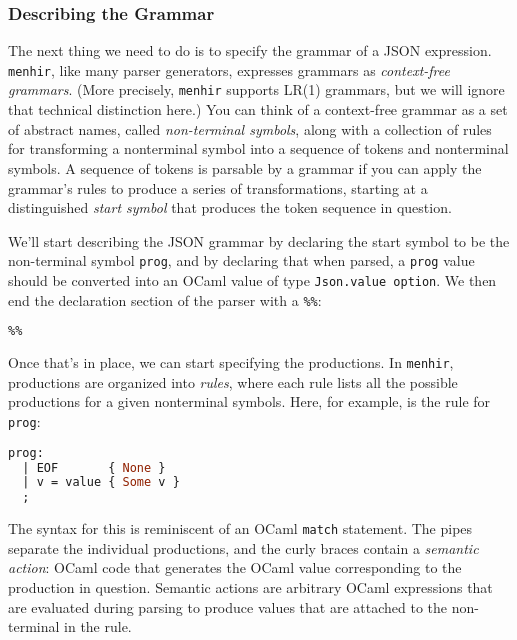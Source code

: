 \hypertarget{describing-the-grammar}{%
\subsubsection{Describing the Grammar}\label{describing-the-grammar}}

The next thing we need to do is to specify the grammar of a JSON
expression. \passthrough{\lstinline!menhir!}, like many parser
generators, expresses grammars as \emph{context-free grammars}. (More
precisely, \passthrough{\lstinline!menhir!} supports LR(1) grammars, but
we will ignore that technical distinction here.) You can think of a
context-free grammar as a set of abstract names, called
\emph{non-terminal symbols}, along with a collection of rules for
transforming a nonterminal symbol into a sequence of tokens and
nonterminal symbols. A sequence of tokens is parsable by a grammar if
you can apply the grammar's rules to produce a series of
transformations, starting at a distinguished \emph{start symbol} that
produces the token sequence in {question}.

We'll start describing the JSON grammar by declaring the start symbol to
be the non-terminal symbol \passthrough{\lstinline!prog!}, and by
declaring that when parsed, a \passthrough{\lstinline!prog!} value
should be converted into an OCaml value of type
\passthrough{\lstinline!Json.value option!}. We then end the declaration
section of the parser with a \passthrough{\lstinline!\%\%!}:

\begin{lstlisting}[language=Caml]
%start <Json.value option> prog
%%
\end{lstlisting}

Once that's in place, we can start specifying the productions. In
\passthrough{\lstinline!menhir!}, productions are organized into
\emph{rules}, where each rule lists all the possible productions for a
given nonterminal symbols. Here, for example, is the rule for
\passthrough{\lstinline!prog!}:

\begin{lstlisting}[language=Caml]
prog:
  | EOF       { None }
  | v = value { Some v }
  ;
\end{lstlisting}

The syntax for this is reminiscent of an OCaml
\passthrough{\lstinline!match!} statement. The pipes separate the
individual productions, and the curly braces contain a \emph{semantic
action}: OCaml code that generates the OCaml value corresponding to the
production in question. Semantic actions are arbitrary OCaml expressions
that are evaluated during parsing to produce values that are attached to
the non-terminal in the rule.


